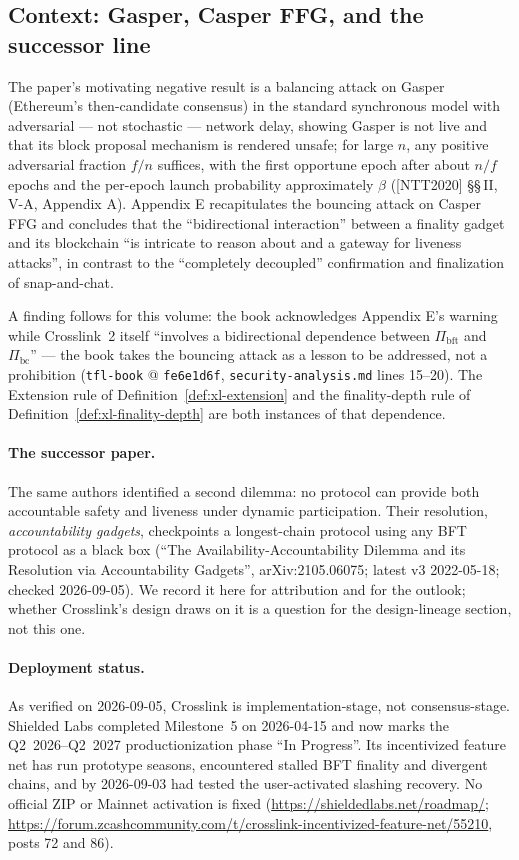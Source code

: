\documentclass[11pt,a4paper]{article}
\theoremstyle{definition}
\begin{document}
\subsection{Context: Gasper, Casper FFG, and the successor line}
\label{sec:xl-model-context}

The paper's motivating negative result is a balancing attack on Gasper
(Ethereum's then-candidate consensus) in the standard synchronous model
with adversarial --- not stochastic --- network delay, showing Gasper is
not live and that its block proposal mechanism is rendered unsafe; for
large $n$, any positive adversarial fraction $f/n$ suffices, with the
first opportune epoch after about $n/f$ epochs and the per-epoch launch
probability approximately $\beta$ ([NTT2020] \S\S\,II, V-A, Appendix A).
Appendix E recapitulates the bouncing attack on Casper FFG and concludes
that the ``bidirectional interaction'' between a finality gadget and its
blockchain ``is intricate to reason about and a gateway for liveness
attacks'', in contrast to the ``completely decoupled'' confirmation and
finalization of snap-and-chat.

A finding follows for this volume: the book acknowledges Appendix E's
warning while Crosslink~2 itself ``involves a bidirectional dependence
between $\Pi_{\mathrm{bft}}$ and $\Pi_{\mathrm{bc}}$'' --- the book takes
the bouncing attack as a lesson to be addressed, not a prohibition
(\texttt{tfl-book} @ \texttt{fe6e1d6f}, \texttt{security-analysis.md}
lines 15--20). The Extension rule of Definition~\ref{def:xl-extension} and
the finality-depth rule of Definition~\ref{def:xl-finality-depth} are both
instances of that dependence.

\paragraph{The successor paper.} The same authors identified a second
dilemma: no protocol can provide both accountable safety and liveness
under dynamic participation. Their resolution, \emph{accountability
gadgets}, checkpoints a longest-chain protocol using any BFT protocol as
a black box (``The Availability-Accountability Dilemma and its Resolution
via Accountability Gadgets'', arXiv:2105.06075; latest v3 2022-05-18;
checked 2026-09-05). We record it here for attribution and for the
outlook; whether Crosslink's design draws on it is a question for the
design-lineage section, not this one.

\paragraph{Deployment status.} As verified on 2026-09-05, Crosslink is
implementation-stage, not consensus-stage. Shielded Labs completed
Milestone~5 on 2026-04-15 and now marks the Q2~2026--Q2~2027
productionization phase ``In Progress''. Its incentivized feature net has
run prototype seasons, encountered stalled BFT finality and divergent
chains, and by 2026-09-03 had tested the user-activated slashing recovery.
No official ZIP or Mainnet activation is fixed
(\url{https://shieldedlabs.net/roadmap/};
\url{https://forum.zcashcommunity.com/t/crosslink-incentivized-feature-net/55210},
posts 72 and 86).
\end{document}
